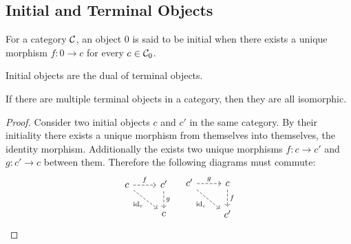 \subsection{Initial and Terminal Objects}

\begin{definition}
  For a category $\mathcal{C}$, an object $0$ is said to be initial when there exists a
  unique morphism $f: 0\to c$ for every $c\in \mathcal{C}_0$.
  \parencite{awodey:category_theory}
\end{definition}

\begin{remark}
  Initial objects are the dual of terminal objects.
\end{remark}

\begin{theorem}\label{thm:initial_object_iso} If
  there are multiple terminal objects in a category, then they are all
  isomorphic.

  \begin{proof}
    Consider two initial objects $c$ and $c'$ in the same category. By their
    initiality there exists a unique morphism from themselves into themselves,
    the identity morphism. Additionally the exists two unique morphisms $f:c\to
    c'$ and $g:c' \to c$ between them. Therefore the following diagrams must
    commute:
    \[\begin{tikzcd}
      c & {c'} \\
      & c
      \arrow["{\id_c}"', dashed, from=1-1, to=2-2]
      \arrow["f", dashed, from=1-1, to=1-2]
      \arrow["g", dashed, from=1-2, to=2-2]
    \end{tikzcd}
    \quad
    \begin{tikzcd}
      {c'} & c \\
      & {c'}
      \arrow["{\id_c}"', dashed, from=1-1, to=2-2]
      \arrow["g", dashed, from=1-1, to=1-2]
      \arrow["f", dashed, from=1-2, to=2-2]
    \end{tikzcd}\]
  \end{proof}
\end{theorem}

